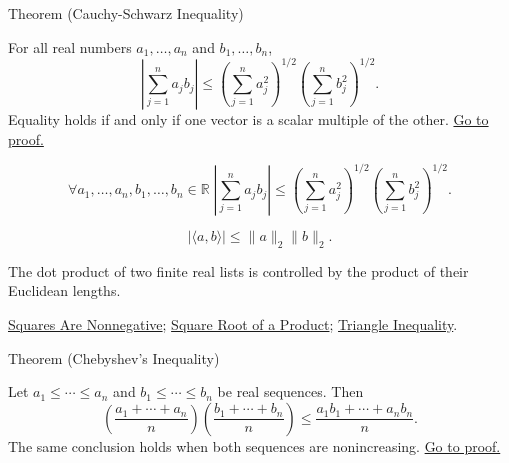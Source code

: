 \begin{theorembox}{Theorem (Cauchy-Schwarz Inequality)}
\begin{theorem}
\label{thm:ineq-cauchy-schwarz}
For all real numbers $a_1,\dots,a_n$ and $b_1,\dots,b_n$,
\[
\left|\sum_{j=1}^{n}a_jb_j\right|
\le
\left(\sum_{j=1}^{n}a_j^2\right)^{1/2}
\left(\sum_{j=1}^{n}b_j^2\right)^{1/2}.
\]
Equality holds if and only if one vector is a scalar multiple of the other.
\hyperref[prf:ineq-cauchy-schwarz]{Go to proof.}
\end{theorem}
\end{theorembox}

\begin{remark*}
\[
\forall a_1,\dots,a_n,b_1,\dots,b_n\in\mathbb{R}\;
\left|\sum_{j=1}^{n}a_jb_j\right|
\le
\left(\sum_{j=1}^{n}a_j^2\right)^{1/2}
\left(\sum_{j=1}^{n}b_j^2\right)^{1/2}.
\]
\end{remark*}

\begin{remark*}
\[
|\langle a,b\rangle|\le \|a\|_2\|b\|_2.
\]
\end{remark*}

\begin{remark*}[Interpretation]
The dot product of two finite real lists is controlled by the product of
their Euclidean lengths.
\end{remark*}

\begin{dependencies}
\hyperref[thm:square-nonnegative]{Squares Are Nonnegative};
\hyperref[thm:sqrt-product]{Square Root of a Product};
\hyperref[thm:triangle-inequality]{Triangle Inequality}.
\end{dependencies}

\begin{theorembox}{Theorem (Chebyshev's Inequality)}
\begin{theorem}
\label{thm:ineq-chebyshev-sum}
Let $a_1\le\cdots\le a_n$ and $b_1\le\cdots\le b_n$ be real sequences.
Then
\[
\left(\frac{a_1+\cdots+a_n}{n}\right)
\left(\frac{b_1+\cdots+b_n}{n}\right)
\le
\frac{a_1b_1+\cdots+a_nb_n}{n}.
\]
The same conclusion holds when both sequences are nonincreasing.
\hyperref[prf:ineq-chebyshev-sum]{Go to proof.}
\end{theorem}
\end{theorembox}

